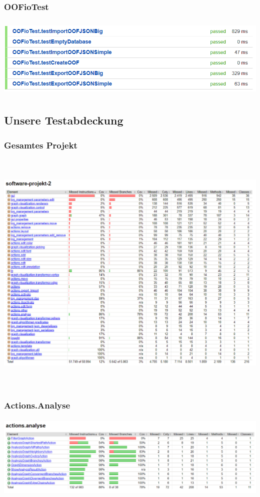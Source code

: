 \documentclass[enabledeprecatedfontcommands]{scrartcl}
\begin{document}
\subsubsection{OOFioTest}
\begin{center}
\includegraphics[height=4cm]{result-oofiotest.png}
\end{center}
\subsection{Unsere Testabdeckung}
\subsubsection{Gesamtes Projekt}
\begin{center}
\includegraphics[height=12cm]{software-projekt-2-testcoverage.png}
\end{center}
\subsubsection{Actions.Analyse}
\begin{center}
\includegraphics[height=4cm]{actions-analyse-testcoverage.png}
\end{center}
\end{document}

